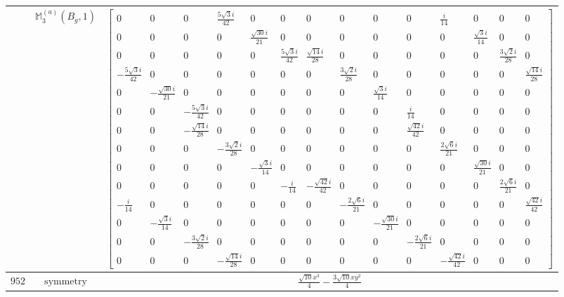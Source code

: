 \documentclass[fleqn,8pt,landscape]{jsarticle}
\begin{document}
\begin{longtable}{ccc}
$  $ & $ \mathbb{M}_{3}^{(a)}(B_{g},1) $ & $ \begin{bmatrix} 0 & 0 & 0 & \frac{5 \sqrt{3} i}{42} & 0 & 0 & 0 & 0 & 0 & 0 & \frac{i}{14} & 0 & 0 & 0 \\ 0 & 0 & 0 & 0 & \frac{\sqrt{30} i}{21} & 0 & 0 & 0 & 0 & 0 & 0 & \frac{\sqrt{3} i}{14} & 0 & 0 \\ 0 & 0 & 0 & 0 & 0 & \frac{5 \sqrt{3} i}{42} & \frac{\sqrt{14} i}{28} & 0 & 0 & 0 & 0 & 0 & \frac{3 \sqrt{2} i}{28} & 0 \\ - \frac{5 \sqrt{3} i}{42} & 0 & 0 & 0 & 0 & 0 & 0 & \frac{3 \sqrt{2} i}{28} & 0 & 0 & 0 & 0 & 0 & \frac{\sqrt{14} i}{28} \\ 0 & - \frac{\sqrt{30} i}{21} & 0 & 0 & 0 & 0 & 0 & 0 & \frac{\sqrt{3} i}{14} & 0 & 0 & 0 & 0 & 0 \\ 0 & 0 & - \frac{5 \sqrt{3} i}{42} & 0 & 0 & 0 & 0 & 0 & 0 & \frac{i}{14} & 0 & 0 & 0 & 0 \\ 0 & 0 & - \frac{\sqrt{14} i}{28} & 0 & 0 & 0 & 0 & 0 & 0 & \frac{\sqrt{42} i}{42} & 0 & 0 & 0 & 0 \\ 0 & 0 & 0 & - \frac{3 \sqrt{2} i}{28} & 0 & 0 & 0 & 0 & 0 & 0 & \frac{2 \sqrt{6} i}{21} & 0 & 0 & 0 \\ 0 & 0 & 0 & 0 & - \frac{\sqrt{3} i}{14} & 0 & 0 & 0 & 0 & 0 & 0 & \frac{\sqrt{30} i}{21} & 0 & 0 \\ 0 & 0 & 0 & 0 & 0 & - \frac{i}{14} & - \frac{\sqrt{42} i}{42} & 0 & 0 & 0 & 0 & 0 & \frac{2 \sqrt{6} i}{21} & 0 \\ - \frac{i}{14} & 0 & 0 & 0 & 0 & 0 & 0 & - \frac{2 \sqrt{6} i}{21} & 0 & 0 & 0 & 0 & 0 & \frac{\sqrt{42} i}{42} \\ 0 & - \frac{\sqrt{3} i}{14} & 0 & 0 & 0 & 0 & 0 & 0 & - \frac{\sqrt{30} i}{21} & 0 & 0 & 0 & 0 & 0 \\ 0 & 0 & - \frac{3 \sqrt{2} i}{28} & 0 & 0 & 0 & 0 & 0 & 0 & - \frac{2 \sqrt{6} i}{21} & 0 & 0 & 0 & 0 \\ 0 & 0 & 0 & - \frac{\sqrt{14} i}{28} & 0 & 0 & 0 & 0 & 0 & 0 & - \frac{\sqrt{42} i}{42} & 0 & 0 & 0 \end{bmatrix} $ \\ \hline
$ 952 $ & $ \text{symmetry} $ & $ \frac{\sqrt{10} x^{3}}{4} - \frac{3 \sqrt{10} x y^{2}}{4} $ \\

\end{longtable}
\end{document}
